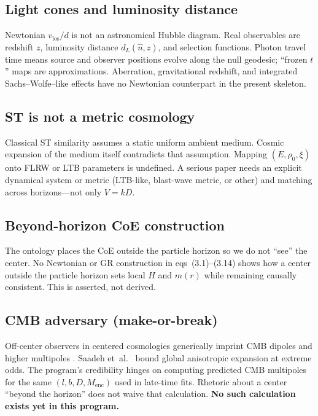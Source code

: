 \documentclass[11pt,a4paper]{article}
\begin{document}
\subsection{Light cones and luminosity distance}

Newtonian \(v_{\mathrm{los}}/d\) is not an astronomical Hubble diagram. Real observables are redshift \(z\), luminosity distance \(d_L(\hat{n},z)\), and selection functions. Photon travel time means source and observer positions evolve along the null geodesic; ``frozen \(t\)'' maps are approximations. Aberration, gravitational redshift, and integrated Sachs--Wolfe--like effects have no Newtonian counterpart in the present skeleton.

\subsection{ST is not a metric cosmology}

Classical ST similarity assumes a static uniform ambient medium. Cosmic expansion of the medium itself contradicts that assumption. Mapping \((E,\rho_0,\xi)\) onto FLRW or LTB parameters is undefined. A serious paper needs an explicit dynamical system or metric (LTB-like, blast-wave metric, or other) and matching across horizons---not only \(V=kD\).

\subsection{Beyond-horizon CoE construction}

The ontology places the CoE outside the particle horizon so we do not ``see'' the center. No Newtonian or GR construction in eqs~(3.1)--(3.14) shows how a center outside the particle horizon sets local \(H\) and \(m(r)\) while remaining causally consistent. This is asserted, not derived.

\subsection{CMB adversary (make-or-break)}

Off-center observers in centered cosmologies generically imprint CMB dipoles and higher multipoles \cite{Alnes2006,Kodama2010}. Saadeh et~al.\ \cite{Saadeh2016} bound global anisotropic expansion at extreme odds. The program's credibility hinges on computing predicted CMB multipoles for the same \((l,b,D,M_{\mathrm{enc}})\) used in late-time fits. Rhetoric about a center ``beyond the horizon'' does not waive that calculation. \textbf{No such calculation exists yet in this program.}
\end{document}
